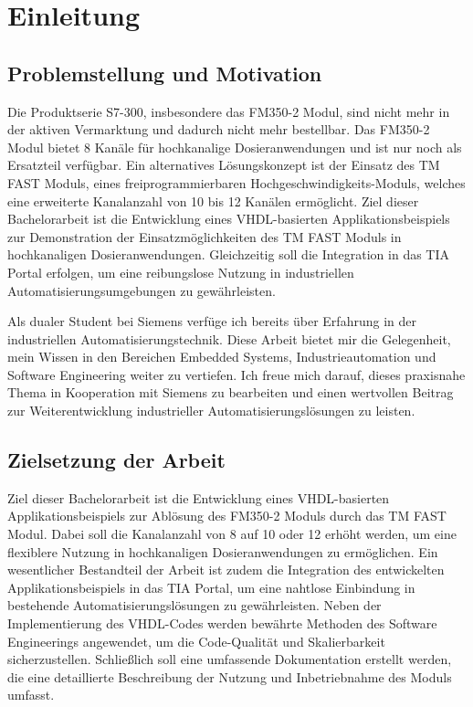 \chapter{Einleitung} 

\section{Problemstellung und Motivation} 
Die Produktserie S7-300, insbesondere das FM350-2 Modul, sind nicht mehr in der aktiven Vermarktung und dadurch nicht mehr bestellbar. Das FM350-2 Modul bietet 8 Kanäle für 
hochkanalige Dosieranwendungen und ist nur noch als Ersatzteil verfügbar. Ein alternatives Lösungskonzept ist der Einsatz des TM FAST Moduls, eines freiprogrammierbaren 
Hochgeschwindigkeits-Moduls, welches eine erweiterte Kanalanzahl von 10 bis 12 Kanälen ermöglicht. Ziel dieser Bachelorarbeit ist die Entwicklung eines VHDL-basierten 
Applikationsbeispiels zur Demonstration der Einsatzmöglichkeiten des TM FAST Moduls in hochkanaligen Dosieranwendungen. Gleichzeitig soll die Integration in das TIA Portal 
erfolgen, um eine reibungslose Nutzung in industriellen Automatisierungsumgebungen zu gewährleisten. 

Als dualer Student bei Siemens verfüge ich bereits über Erfahrung in der industriellen Automatisierungstechnik. Diese Arbeit bietet mir die Gelegenheit, mein Wissen in den 
Bereichen Embedded Systems, Industrieautomation und Software Engineering weiter zu vertiefen. Ich freue mich darauf, dieses praxisnahe Thema in Kooperation mit Siemens zu 
bearbeiten und einen wertvollen Beitrag zur Weiterentwicklung industrieller Automatisierungslösungen zu leisten. 
\section{Zielsetzung der Arbeit} 
Ziel dieser Bachelorarbeit ist die Entwicklung eines VHDL-basierten Applikationsbeispiels zur Ablösung des FM350-2 Moduls durch das TM FAST Modul. Dabei soll die Kanalanzahl von 8 
auf 10 oder 12 erhöht werden, um eine flexiblere Nutzung in hochkanaligen Dosieranwendungen zu ermöglichen. Ein wesentlicher Bestandteil der Arbeit ist zudem die Integration des 
entwickelten Applikationsbeispiels in das TIA Portal, um eine nahtlose Einbindung in bestehende Automatisierungslösungen zu gewährleisten. Neben der Implementierung des VHDL-Codes 
werden bewährte Methoden des Software Engineerings angewendet, um die Code-Qualität und Skalierbarkeit sicherzustellen. Schließlich soll eine umfassende Dokumentation erstellt 
werden, die eine detaillierte Beschreibung der Nutzung und Inbetriebnahme des Moduls umfasst. 
